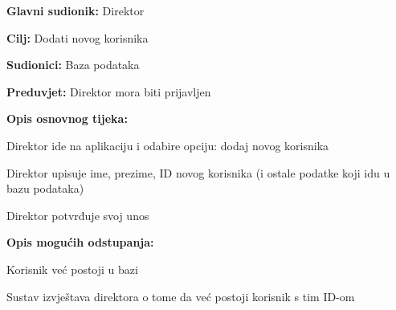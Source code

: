 			\noindent {}
			\begin{packed_item}
				
				\item \textbf{Glavni sudionik: } Direktor
				\item  \textbf{Cilj:} Dodati novog korisnika
				\item  \textbf{Sudionici:} Baza podataka
				\item  \textbf{Preduvjet:} Direktor mora biti prijavljen
				\item  \textbf{Opis osnovnog tijeka:}
				
				\item[] \begin{packed_enum}
					
					\item Direktor ide na aplikaciju i odabire opciju: dodaj novog korisnika
					\item Direktor upisuje ime, prezime, ID novog korisnika (i ostale podatke koji idu u bazu podataka)
					\item Direktor potvrđuje svoj unos
				\end{packed_enum}
				
				\item  \textbf{Opis mogućih odstupanja:}
				
				\item[] \begin{packed_item}
					
					\item[2.a] Korisnik već postoji u bazi
					\item[] \begin{packed_enum}
						
						\item Sustav izvještava direktora o tome da već postoji korisnik s tim ID-om
						
					\end{packed_enum}
					
				\end{packed_item}
			\end{packed_item}
			
